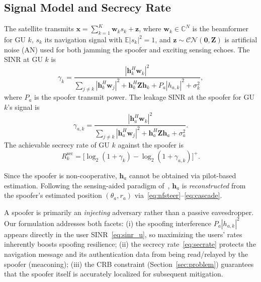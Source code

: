 \subsection{Signal Model and Secrecy Rate}
The satellite transmits $\mathbf{x} = \sum_{k=1}^{K} \mathbf{w}_k s_k + \mathbf{z}$, where $\mathbf{w}_k \in \mathbb{C}^N$ is the beamformer for GU $k$, $s_k$ its navigation signal with $\mathbb{E}|s_k|^2 = 1$, and $\mathbf{z} \sim \mathcal{CN}(\mathbf{0}, \mathbf{Z})$ is artificial noise (AN) used for both jamming the spoofer and exciting sensing echoes. The SINR at GU $k$ is
\begin{equation}\label{eq:sinr_u}
    \gamma_k = \frac{|\mathbf{h}_k^H \mathbf{w}_k|^2}{\sum_{j \neq k} |\mathbf{h}_k^H \mathbf{w}_j|^2 + \mathbf{h}_k^H \mathbf{Z} \mathbf{h}_k + P_a |h_{a,k}|^2 + \sigma_k^2},
\end{equation}
where $P_a$ is the spoofer transmit power. The leakage SINR at the spoofer for GU $k$'s signal is
\begin{equation}\label{eq:sinr_a}
    \gamma_{a,k} = \frac{|\mathbf{h}_a^H \mathbf{w}_k|^2}{\sum_{j \neq k} |\mathbf{h}_a^H \mathbf{w}_j|^2 + \mathbf{h}_a^H \mathbf{Z} \mathbf{h}_a + \sigma_a^2}.
\end{equation}
The achievable secrecy rate of GU $k$ against the spoofer is
\begin{equation}\label{eq:secrate}
    R_k^{\mathrm{sec}} = \big[\log_2(1 + \gamma_k) - \log_2(1 + \gamma_{a,k})\big]^+.
\end{equation}

\begin{remark}
Since the spoofer is non-cooperative, $\mathbf{h}_a$ cannot be obtained via pilot-based estimation. Following the sensing-aided paradigm of~\cite{zhao2025nearfield}, $\mathbf{h}_a$ is \emph{reconstructed} from the spoofer's estimated position $(\theta_a, r_a)$ via~\eqref{eq:nfsteer}--\eqref{eq:cascade}.
\end{remark}

\begin{remark}
A spoofer is primarily an \emph{injecting} adversary rather than a passive eavesdropper. Our formulation addresses both facets: (i) the spoofing interference $P_a|h_{a,k}|^2$ appears directly in the user SINR~\eqref{eq:sinr_u}, so maximizing the users' rates inherently boosts spoofing resilience; (ii) the secrecy rate~\eqref{eq:secrate} protects the navigation message and its authentication data from being read/relayed by the spoofer (meaconing); (iii) the CRB constraint (Section~\ref{sec:problem}) guarantees that the spoofer itself is accurately localized for subsequent mitigation.
\end{remark}

